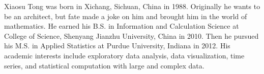 %
%
%
%

\begin{vita}

Xiaosu Tong was born in Xichang, Sichuan, China in 1988. Originally he wants to 
be an architect, but fate made a joke on him and brought him in the world of 
mathematics. He earned his B.S. in 
Information and Calculation Science at College of Science, Shenyang Jianzhu 
University, China in 2010. Then he pursued his M.S. in Applied Statistics at Purdue
University, Indiana in 2012. His academic interests include exploratory data 
analysis, data visualization, time series, and statistical computation with
large and complex data.

\end{vita}
